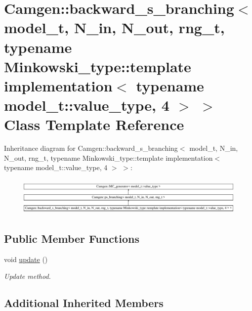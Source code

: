 \hypertarget{a00020}{\section{Camgen\-:\-:backward\-\_\-s\-\_\-branching$<$ model\-\_\-t, N\-\_\-in, N\-\_\-out, rng\-\_\-t, typename Minkowski\-\_\-type\-:\-:template implementation$<$ typename model\-\_\-t\-:\-:value\-\_\-type, 4 $>$ $>$ Class Template Reference}
\label{a00020}
}
Inheritance diagram for Camgen\-:\-:backward\-\_\-s\-\_\-branching$<$ model\-\_\-t, N\-\_\-in, N\-\_\-out, rng\-\_\-t, typename Minkowski\-\_\-type\-:\-:template implementation$<$ typename model\-\_\-t\-:\-:value\-\_\-type, 4 $>$ $>$\-:\begin{figure}[H]
\begin{center}
\leavevmode
\includegraphics[height=1.883408cm]{a00020}
\end{center}
\end{figure}
\subsection*{Public Member Functions}
\begin{DoxyCompactItemize}
\item 
void \hyperlink{a00020_a8848c2cb3ee924738dc9d530d6a7f168}{update} ()
\begin{DoxyCompactList}\small\item\em Update method. \end{DoxyCompactList}\end{DoxyCompactItemize}
\subsection*{Additional Inherited Members}


